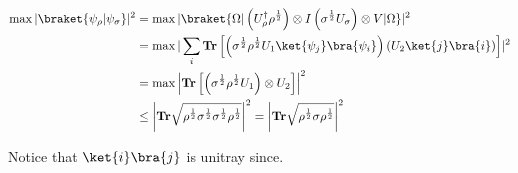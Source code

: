 \documentclass[12pt,a4paper]{article}
\begin{document}
\begin{equation*}
  \begin{split}
    \max | \braket{ \psi_\rho | \psi_\sigma } |^2  & = \max  | \braket{\Omega |   \left( U_{\rho}^{\dagger} \rho^{\frac{1}{2}}  \right) \otimes I   \left( \sigma^{\frac{1}{2}} U_{\sigma} \right) \otimes V     | \Omega}  |^{2} \\
  & = \max |   \sum_{i}{  \mathbf{Tr} \left[  \left(  \sigma^{\frac{1}{2}}\rho^{\frac{1}{2}}U_{1} \ket{\psi_{j}}\bra{\psi_i} \right)   \left( U_{2}\ket{j} \bra{i}\right) \right]  }  |^{2} \\
  & = \max \left|     \mathbf{Tr} \left[  \left(  \sigma^{\frac{1}{2}}\rho^{\frac{1}{2}}U_{1}  \right) \otimes U_{2}  \right]    \right|^{2} \\
  & \le \left|   \mathbf{Tr} \sqrt{      \rho^{\frac{1}{2}} \sigma^{\frac{1}{2}} \sigma^{\frac{1}{2}}\rho^{\frac{1}{2}}   }   \right|^{2} = \left|   \mathbf{Tr} \sqrt{      \rho^{\frac{1}{2}} \sigma \rho^{\frac{1}{2}}   }   \right|^{2}  \\
  \end{split}
\end{equation*}

Notice that $\ket{i}\bra{j}$ is unitray since. 



\printbibliography 
\end{document}

